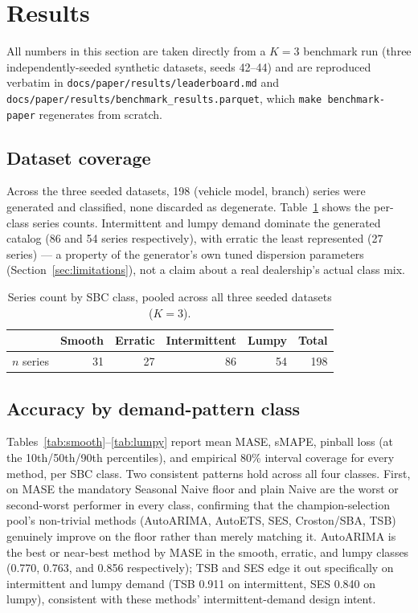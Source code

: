 \documentclass[11pt]{article}
\begin{document}
\section{Results}
\label{sec:results}

All numbers in this section are taken directly from a $K=3$ benchmark run
(three independently-seeded synthetic datasets, seeds 42--44) and are reproduced
verbatim in \texttt{docs/paper/results/leaderboard.md} and
\texttt{docs/paper/results/benchmark\_results.parquet}, which \texttt{make
benchmark-paper} regenerates from scratch.

\subsection{Dataset coverage}

Across the three seeded datasets, 198 (vehicle model, branch) series were generated
and classified, none discarded as degenerate. Table~\ref{tab:coverage} shows the
per-class series counts. Intermittent and lumpy demand dominate the generated
catalog (86 and 54 series respectively), with erratic the least represented (27
series) --- a property of the generator's own tuned dispersion parameters
(Section~\ref{sec:limitations}), not a claim about a real dealership's actual class
mix.

\begin{table}[htbp]
\centering
\begin{tabular}{lrrrrr}
\toprule
& Smooth & Erratic & Intermittent & Lumpy & Total \\
\midrule
$n$ series & 31 & 27 & 86 & 54 & 198 \\
\bottomrule
\end{tabular}
\caption{Series count by SBC class, pooled across all three seeded datasets ($K=3$).}
\label{tab:coverage}
\end{table}

\subsection{Accuracy by demand-pattern class}

Tables~\ref{tab:smooth}--\ref{tab:lumpy} report mean MASE, sMAPE, pinball loss (at
the 10th/50th/90th percentiles), and empirical 80\% interval coverage for every
method, per SBC class. Two consistent patterns hold across all four classes.
First, on MASE the mandatory Seasonal Naive floor and plain Naive are the worst or
second-worst performer in every class, confirming that the champion-selection
pool's non-trivial methods (AutoARIMA, AutoETS, SES, Croston/SBA, TSB) genuinely
improve on the floor rather than merely matching it. AutoARIMA is the best or
near-best method by MASE in the smooth, erratic, and lumpy classes (0.770, 0.763,
and 0.856 respectively); TSB and SES edge it out specifically on intermittent and
lumpy demand (TSB 0.911 on intermittent, SES 0.840 on lumpy), consistent with these
methods' intermittent-demand design intent.
\end{document}
